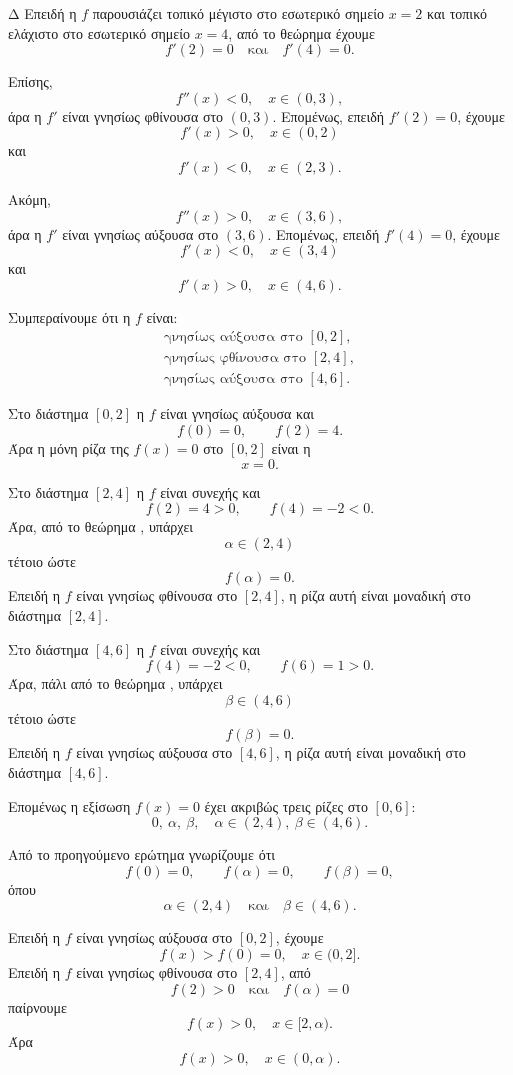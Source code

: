 \begin{thema}{Δ}
Επειδή η $f$ παρουσιάζει τοπικό μέγιστο στο εσωτερικό σημείο $x=2$ και
τοπικό ελάχιστο στο εσωτερικό σημείο $x=4$, από το θεώρημα 
έχουμε
\[
f'(2)=0
\quad\text{και}\quad
f'(4)=0.
\]

Επίσης,
\[
f''(x)<0,\quad x\in(0,3),
\]
άρα η $f'$ είναι γνησίως φθίνουσα στο $(0,3)$. Επομένως, επειδή
$f'(2)=0$, έχουμε
\[
f'(x)>0,\quad x\in(0,2)
\]
και
\[
f'(x)<0,\quad x\in(2,3).
\]

Ακόμη,
\[
f''(x)>0,\quad x\in(3,6),
\]
άρα η $f'$ είναι γνησίως αύξουσα στο $(3,6)$. Επομένως, επειδή
$f'(4)=0$, έχουμε
\[
f'(x)<0,\quad x\in(3,4)
\]
και
\[
f'(x)>0,\quad x\in(4,6).
\]

Συμπεραίνουμε ότι η $f$ είναι:
\[
\begin{array}{c}
\text{γνησίως αύξουσα στο }[0,2],\\
\text{γνησίως φθίνουσα στο }[2,4],\\
\text{γνησίως αύξουσα στο }[4,6].
\end{array}
\]

\begin{erwthma}
\item Στο διάστημα $[0,2]$ η $f$ είναι γνησίως αύξουσα και
\[
f(0)=0,\qquad f(2)=4.
\]
Άρα η μόνη ρίζα της $f(x)=0$ στο $[0,2]$ είναι η
\[
x=0.
\]

Στο διάστημα $[2,4]$ η $f$ είναι συνεχής και
\[
f(2)=4>0,
\qquad
f(4)=-2<0.
\]
Άρα, από το θεώρημα , υπάρχει
\[
\alpha\in(2,4)
\]
τέτοιο ώστε
\[
f(\alpha)=0.
\]
Επειδή η $f$ είναι γνησίως φθίνουσα στο $[2,4]$, η ρίζα αυτή είναι
μοναδική στο διάστημα $[2,4]$.

Στο διάστημα $[4,6]$ η $f$ είναι συνεχής και
\[
f(4)=-2<0,
\qquad
f(6)=1>0.
\]
Άρα, πάλι από το θεώρημα , υπάρχει
\[
\beta\in(4,6)
\]
τέτοιο ώστε
\[
f(\beta)=0.
\]
Επειδή η $f$ είναι γνησίως αύξουσα στο $[4,6]$, η ρίζα αυτή είναι
μοναδική στο διάστημα $[4,6]$.

Επομένως η εξίσωση $f(x)=0$ έχει ακριβώς τρεις ρίζες στο $[0,6]$:
\[
{0,\ \alpha,\ \beta},
\quad
\alpha\in(2,4),\ \beta\in(4,6).
\]

\item Από το προηγούμενο ερώτημα γνωρίζουμε ότι
\[
f(0)=0,\qquad f(\alpha)=0,\qquad f(\beta)=0,
\]
όπου
\[
\alpha\in(2,4)
\quad\text{και}\quad
\beta\in(4,6).
\]

Επειδή η $f$ είναι γνησίως αύξουσα στο $[0,2]$, έχουμε
\[
f(x)>f(0)=0,\quad x\in(0,2].
\]
Επειδή η $f$ είναι γνησίως φθίνουσα στο $[2,4]$, από
\[
f(2)>0
\quad\text{και}\quad
f(\alpha)=0
\]
παίρνουμε
\[
f(x)>0,\quad x\in[2,\alpha).
\]
Άρα
\[
f(x)>0,\quad x\in(0,\alpha).
\]


\end{erwthma}
\end{thema}
